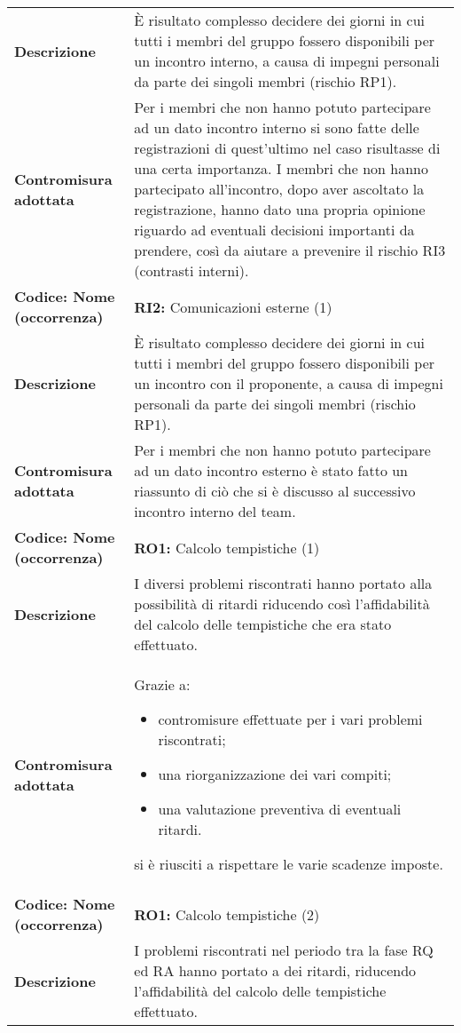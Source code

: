 {\begin{longtable}{C{3.5cm} | C{11cm}}
\textbf{Descrizione} & È risultato complesso decidere dei giorni in cui tutti i membri del gruppo fossero disponibili per un incontro interno, a causa di impegni personali da parte dei singoli membri (rischio RP1).\\ 
\textbf{Contromisura adottata} & Per i membri che non hanno potuto partecipare ad un dato incontro interno si sono fatte delle registrazioni di quest'ultimo nel caso risultasse di una certa importanza. I membri che non hanno partecipato all'incontro, dopo aver ascoltato la registrazione, hanno dato una propria opinione riguardo ad eventuali decisioni importanti da prendere, così da aiutare a prevenire il rischio RI3 (contrasti interni).\\
\hline
\hline
{}\textbf{Codice: Nome (occorrenza)} & \textbf{RI2: }{Comunicazioni esterne (1)}\\ 
\textbf{Descrizione} & È risultato complesso decidere dei giorni in cui tutti i membri del gruppo fossero disponibili per un incontro con il proponente, a causa di impegni personali da parte dei singoli membri (rischio RP1).\\ 
\textbf{Contromisura adottata} & Per i membri che non hanno potuto partecipare ad un dato incontro esterno è stato fatto un riassunto di ciò che si è discusso al successivo incontro interno del team.\\
\hline
\hline
{}\textbf{Codice: Nome (occorrenza)} & \textbf{RO1: }{Calcolo tempistiche (1)}\\
\textbf{Descrizione} & I diversi problemi riscontrati hanno portato alla possibilità di ritardi riducendo così l'affidabilità del calcolo delle tempistiche che era stato effettuato.\\
\textbf{Contromisura adottata} & Grazie a: 
\begin{itemize}
\item contromisure effettuate per i vari problemi riscontrati;
\item una riorganizzazione dei vari compiti;
\item una valutazione preventiva di eventuali ritardi.
\end{itemize} 
si è riusciti a rispettare le varie scadenze imposte.\\
\hline
\hline
{}\textbf{Codice: Nome (occorrenza)} & \textbf{RO1: }{Calcolo tempistiche (2)}\\
\textbf{Descrizione} & I problemi riscontrati nel periodo tra la fase RQ ed RA hanno portato a dei ritardi, riducendo l'affidabilità del calcolo delle tempistiche effettuato.\\

\end{longtable}}
